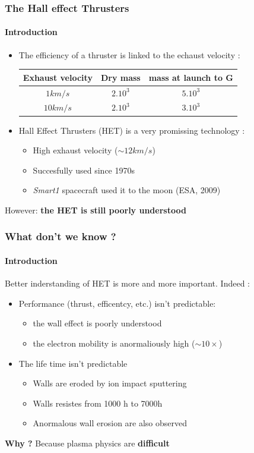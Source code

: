 \documentclass[sans, aspectratio=169]{beamer}
\begin{document}
\begin{frame} 
	\frametitle{The Hall effect Thrusters} 
	\framesubtitle{Introduction} 
	\begin{itemize} 
		\item The efficiency of a thruster is linked to the echaust velocity :
		
		\renewcommand{\arraystretch}{1.2}%
		\begin{center}
			\begin{tabular}{c|c|c}
				Exhaust velocity & Dry mass & mass at launch to G\\ \hline 
				$1 km/s$ &   $2.10^3$      &  $5.10^3$  \\
				$10 km/s$&  $2.10^3$    &  $3.10^3$ 
			\end{tabular}
		\end{center}
		\item Hall Effect Thrusters (HET) is a very promissing technology :
		\begin{itemize} 
			\item High exhaust velocity ($\sim 12 km/s$)
			\item Succesfully used since 1970s
			\item \textit{Smart1} spacecraft used it to the moon (ESA, 2009)
		\end{itemize}
	\end{itemize}
	
	
	However: \textbf{the HET is still poorly understood}

\end{frame}

\begin{frame} 
\frametitle{What don't we know ?} 
\framesubtitle{Introduction} 
Better inderstanding of HET is more and more important. Indeed :

\begin{itemize}
\item Performance (thrust, efficentcy, etc.) isn't predictable:
	\begin{itemize}
		\item the wall effect is poorly understood
		\item the electron mobility is anormaliously high ($\sim 10 \times$)
	\end{itemize}
\item The life time isn't predictable
	\begin{itemize}
		\item Walls are eroded by ion impact sputtering
		\item Walls resistes from 1000 h to 7000h
		
		\item Anormalous wall erosion are also observed
	\end{itemize}
\end{itemize}

\textbf{Why ?} \pause Because plasma physics are \textbf{difficult}

\end{frame}
\end{document}
